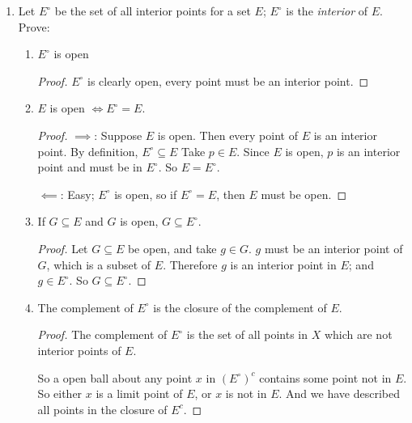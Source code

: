 \documentclass{article}
\begin{document}
\begin{enumerate}
\begin{proof}
        TODO is this the right process?
        Suppose $z=z'=x+iy$, then clearly $|z|=\sqrt{x^2+y^2}= |z'|$, so $r$ is unique, and since $r$ is unique $w$ is.????
    \end{proof}

\item Let $E^{\circ}$ be the set of all interior points for a set $E$; $E^{\circ}$ is the \textit{interior} of $E$. Prove:
\begin{enumerate}[label= (\alph*)] 
    \item $E^{\circ}$ is open

        \begin{proof} 
            $E^{\circ}$ is clearly open, every point must be an interior point.
        \end{proof}

    \item $E$ is open $\iff E^{\circ}=E$.
        \begin{proof} 
            $\implies$: Suppose $E$ is open. Then every point of $E$ is an interior point.
            By definition, $E^{\circ}\subseteq E$ Take $p \in E$. Since $E$ is open, $p$ is
            an interior point and must be in $E^{\circ}$. So $E=E^{\circ}$.

            $\impliedby$: Easy; $E^{\circ}$ is open, so if $E^\circ=E$, then $E$ must be open.
        \end{proof}
    \item If $G\subseteq E$ and $G$ is open, $G\subseteq E^{\circ}$.
        \begin{proof} 
            Let $G\subseteq E$ be open, and take $g\in G$. $g$ must be an interior point of $G$, which
            is a subset of $E$. Therefore $g$ is an interior point in $E$; and $g\in E^{\circ}$.
            So $G\subseteq E^{\circ}$.
        \end{proof}
    \item The complement of $E^{\circ}$ is the closure of the complement of $E$.

        \begin{proof} 
            The complement of $E^{\circ}$ is the set of all points in $X$ which are not interior points of $E$.

            So a open ball about any point $x$ in $(E^{\circ})^{c}$ contains some point not in $E$. So either $x$ is a limit point of $E$, or $x$ is not in $E$. And we have described all points in the closure of $E^{c}$.
        \end{proof}


\end{enumerate}
\end{enumerate}
\end{document}
